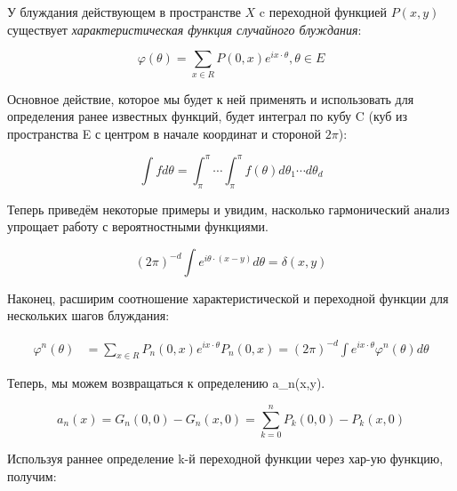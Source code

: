 У блуждания действующем в пространстве $X$ c переходной функцией $P(x,y)$ существует \textit{характеристическая функция случайного блуждания}:

\[ \varphi(\theta) = \sum_{x \in R} P(0,x) e^{i x \cdot \theta}, \theta \in E \]

Основное действие, которое мы будет к ней применять и использовать для определения ранее известных функций, будет интеграл по кубу C (куб из пространства E 
с центром в начале координат и стороной $2\pi$):

\[ \int f d\theta = \int^\pi_\pi \cdots \int^\pi_\pi f(\theta) d\theta_1 \cdots d\theta_d \]

Теперь приведём некоторые примеры и увидим, насколько гармонический анализ упрощает работу с вероятностными функциями.

\[ (2\pi)^{-d} \int e^{i\theta \cdot (x-y)} d\theta = \delta(x,y) \]

Наконец, расширим соотношение характеристической и переходной функции для нескольких шагов блуждания:

\begin{align*}
\varphi^n(\theta) &= \sum_{x \in R} P_n(0,x) e^{i x \cdot \theta}
P_n(0,x) = (2\pi)^{-d} \int e^{i x\cdot \theta } \varphi^n(\theta) d\theta
\end{align*}

Теперь, мы можем возвращаться к определению a_n(x,y).

\[ a_n(x) = G_n(0,0) - G_n(x,0) = \sum_{k=0}^{n} P_k(0,0) - P_k(x,0) \]

Используя раннее определение k-й переходной функции через хар-ую функцию, получим:

